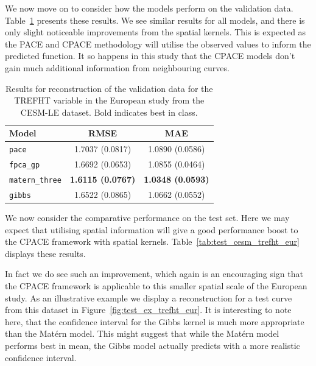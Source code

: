 We now move on to consider how the models perform on the validation data.
Table~\ref{tab:train_cesm_trefht_eur} presents these results.
We see similar results for all models, and there is only slight noticeable improvements from the spatial kernels.
This is expected as the PACE and CPACE methodology will utilise the observed values to inform the predicted function.
It so happens in this study that the CPACE models don't gain much additional information from neighbouring curves. 

\begin{table}
	\caption[Results for the TREFHT variable on validation data in the European study.]{Results for reconstruction of the validation data for the TREFHT variable in the European study from the CESM-LE dataset. Bold indicates best in class.}
	\centering
	\label{tab:train_cesm_trefht_eur}
	\begin{tabular}{lcc}
		\toprule
		\textbf{Model} & \textbf{RMSE} & \textbf{MAE} \\
		\midrule
		\verb*|pace| & 1.7037 (0.0817) & 1.0890	(0.0586) \\
		\verb*|fpca_gp| & 1.6692 (0.0653) & 1.0855	(0.0464) \\
		\verb*|matern_three| & \textbf{1.6115 (0.0767)} & \textbf{1.0348	(0.0593)}\\
		\verb*|gibbs| & 1.6522	(0.0865) & 1.0662 (0.0552)\\
		\bottomrule
	\end{tabular}
\end{table}

We now consider the comparative performance on the test set.
Here we may expect that utilising spatial information will give a good performance boost to the CPACE framework with spatial kernels.
Table~\ref{tab:test_cesm_trefht_eur} displays these results.

In fact we do see such an improvement, which again is an encouraging sign that the CPACE framework is applicable to this smaller spatial scale of the European study.
As an illustrative example we display a reconstruction for a test curve from this dataset in Figure~\ref{fig:test_ex_trefht_eur}.
It is interesting to note here, that the confidence interval for the Gibbs kernel is much more appropriate than the Mat\'ern model. 
This might suggest that while the Mat\'ern model performs best in mean, the Gibbs model actually predicts with a more realistic confidence interval. 


